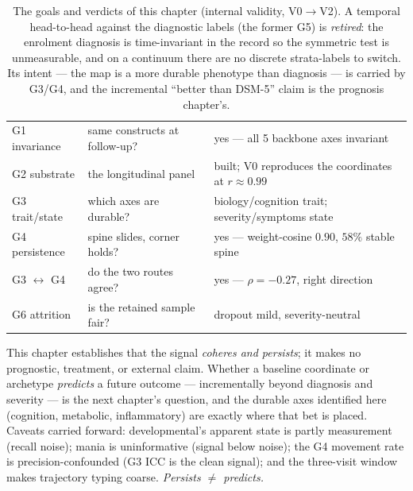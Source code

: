 \begin{table}[h]\centering\small\sffamily
\caption{The goals and verdicts of this chapter (internal validity, V0$\to$V2). A temporal head-to-head against
the diagnostic labels (the former G5) is \emph{retired}: the enrolment diagnosis is time-invariant in the record
so the symmetric test is unmeasurable, and on a continuum there are no discrete strata-labels to switch. Its
intent --- the map is a more durable phenotype than diagnosis --- is carried by G3/G4, and the incremental
``better than DSM-5'' claim is the prognosis chapter's.}
\label{tab:m3goals}
\begin{tabular}{L{2.0cm} L{5.4cm} L{5.4cm}}
\toprule
{} &  & \\
\midrule
{} G1 invariance & same constructs at follow-up? & yes --- all 5 backbone axes invariant\\
G2 substrate & the longitudinal panel & built; V0 reproduces the coordinates at $r\approx0.99$\\
 G3 trait/state & which axes are durable? & biology/cognition trait; severity/symptoms state\\
G4 persistence & spine slides, corner holds? & yes --- weight-cosine $0.90$, $58\%$ stable spine\\
 G3 $\leftrightarrow$ G4 & do the two routes agree? & yes --- $\rho=-0.27$, right direction\\
G6 attrition & is the retained sample fair? & dropout mild, severity-neutral\\
\bottomrule
\end{tabular}
\end{table}

\begin{openbox}
This chapter establishes that the signal \emph{coheres and persists}; it makes no prognostic, treatment, or external
claim. Whether a baseline coordinate or archetype \emph{predicts} a future outcome --- incrementally beyond
diagnosis and severity --- is the next chapter's question, and the durable axes identified here (cognition, metabolic, inflammatory) are
exactly where that bet is placed. Caveats carried forward: developmental's apparent state is partly measurement
(recall noise); mania is uninformative (signal below noise); the G4 movement rate is precision-confounded (G3 ICC
is the clean signal); and the three-visit window makes trajectory typing coarse. \emph{Persists $\ne$ predicts.}
\end{openbox}
